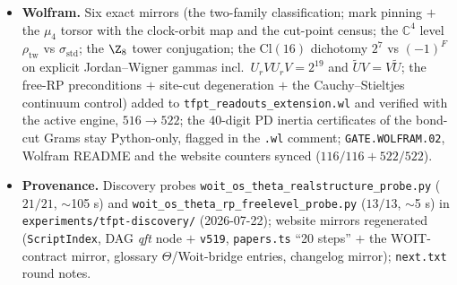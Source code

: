 \documentclass[11pt]{article}
\begin{document}
\begin{itemize}[leftmargin=1.5em]
\texttt{v519\_woit\_theta\_rp\_free.py} is cited via \texttt{veri} in
\texttt{tfpt\_research\_contracts} and \texttt{tfpt\_3}.
\item \textbf{Wolfram.} Six exact mirrors (the two-family classification; mark pinning $+$ the
$\mu_4$ torsor with the clock-orbit map and the cut-point census; the $\mathbb{C}^4$ level
$\rho_{\mathrm{tw}}$ vs $\sigma_{\mathrm{std}}$; the $\Z_8$ tower conjugation; the
$\mathrm{Cl}(16)$ dichotomy $2^7$ vs $(-1)^F$ on explicit Jordan--Wigner gammas incl.\
$U_rVU_rV=2^{19}$ and $\tilde UV=V\tilde U$; the free-RP preconditions $+$ site-cut
degeneration $+$ the Cauchy--Stieltjes continuum control) added to
\texttt{tfpt\_readouts\_extension.wl} and verified with the active engine, $516\to522$; the
$40$-digit PD inertia certificates of the bond-cut Grams stay Python-only, flagged in the
\texttt{.wl} comment; \texttt{GATE.WOLFRAM.02}, Wolfram README and the website counters synced
($116/116+522/522$).
\item \textbf{Provenance.} Discovery probes \texttt{woit\_os\_theta\_realstructure\_probe.py}
($21/21$, $\sim$105 s) and \texttt{woit\_os\_theta\_rp\_freelevel\_probe.py} ($13/13$,
$\sim$5 s) in \texttt{experiments/tfpt-discovery/} (2026-07-22); website mirrors regenerated
(\texttt{ScriptIndex}, DAG \emph{qft} node $+$ \texttt{v519}, \texttt{papers.ts} ``20 steps''
$+$ the WOIT-contract mirror, glossary $\Theta$/Woit-bridge entries, changelog mirror);
\texttt{next.txt} round notes.
\end{itemize}
\end{document}

